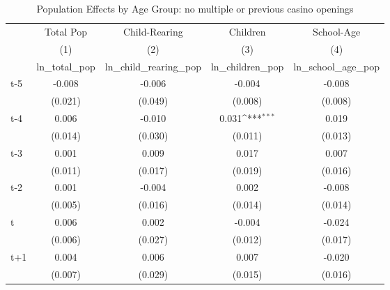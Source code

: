 \begin{table}[htbp]\centering
\def\sym#1{\ifmmode^{#1}\else\(^{#1}\)\fi}
\caption{Population Effects by Age Group: no multiple or previous casino openings}
\begin{tabular}{l*{4}{c}}
\hline\hline
            &\multicolumn{1}{c}{Total Pop}&\multicolumn{1}{c}{Child-Rearing}&\multicolumn{1}{c}{Children}&\multicolumn{1}{c}{School-Age}\\\cmidrule(lr){2-2}\cmidrule(lr){3-3}\cmidrule(lr){4-4}\cmidrule(lr){5-5}
            &\multicolumn{1}{c}{(1)}&\multicolumn{1}{c}{(2)}&\multicolumn{1}{c}{(3)}&\multicolumn{1}{c}{(4)}\\
            &\multicolumn{1}{c}{ln\_total\_pop}&\multicolumn{1}{c}{ln\_child\_rearing\_pop}&\multicolumn{1}{c}{ln\_children\_pop}&\multicolumn{1}{c}{ln\_school\_age\_pop}\\
\hline
t-5         &      -0.008         &      -0.006         &      -0.004         &      -0.008         \\
            &     (0.021)         &     (0.049)         &     (0.008)         &     (0.008)         \\
[1em]
t-4         &       0.006         &      -0.010         &       0.031\sym{***}&       0.019         \\
            &     (0.014)         &     (0.030)         &     (0.011)         &     (0.013)         \\
[1em]
t-3         &       0.001         &       0.009         &       0.017         &       0.007         \\
            &     (0.011)         &     (0.017)         &     (0.019)         &     (0.016)         \\
[1em]
t-2         &       0.001         &      -0.004         &       0.002         &      -0.008         \\
            &     (0.005)         &     (0.016)         &     (0.014)         &     (0.014)         \\
[1em]
t           &       0.006         &       0.002         &      -0.004         &      -0.024         \\
            &     (0.006)         &     (0.027)         &     (0.012)         &     (0.017)         \\
[1em]
t+1         &       0.004         &       0.006         &       0.007         &      -0.020         \\
            &     (0.007)         &     (0.029)         &     (0.015)         &     (0.016)         \\

\end{tabular}
\end{table}
